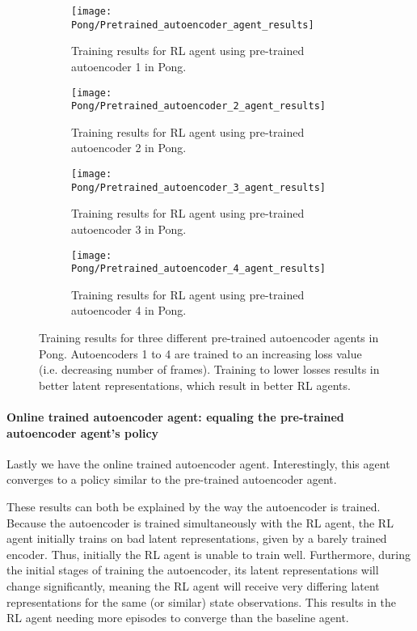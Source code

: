 \begin{figure}[h]
	\centering
	\begin{subfigure}[b]{0.49\textwidth}
		\texttt{[image: Pong/Pretrained\_autoencoder\_agent\_results]}
		\caption{Training results for RL agent using pre-trained autoencoder 1 in Pong.}
		\label{fig:ae1-results-pong}
	\end{subfigure}
	\begin{subfigure}[b]{0.49\textwidth}
		\texttt{[image: Pong/Pretrained\_autoencoder\_2\_agent\_results]}
		\caption{Training results for RL agent using pre-trained autoencoder 2 in Pong.}
		\label{fig:ae2-results-pong}
	\medskip
	\end{subfigure}
	\begin{subfigure}[b]{0.49\textwidth}
		\texttt{[image: Pong/Pretrained\_autoencoder\_3\_agent\_results]}
		\caption{Training results for RL agent using pre-trained autoencoder 3 in Pong.}
		\label{fig:ae3-results-pong}
	\end{subfigure}
	\begin{subfigure}[b]{0.49\textwidth}
		\texttt{[image: Pong/Pretrained\_autoencoder\_4\_agent\_results]}
		\caption{Training results for RL agent using pre-trained autoencoder 4 in Pong.}
		\label{fig:ae4-results-pong}
	\end{subfigure}
	\caption{Training results for three different pre-trained autoencoder agents in Pong. Autoencoders 1 to 4 are trained to an increasing loss value (i.e. decreasing number of frames). Training to lower losses results in better latent representations, which result in better RL agents.}
	\label{fig:ae-results-pong}
\end{figure}

\clearpage
\paragraph{Online trained autoencoder agent: equaling the pre-trained autoencoder agent's policy}
Lastly we have the online trained autoencoder agent. Interestingly, this agent converges to a policy similar to the pre-trained autoencoder agent.

These results can both be explained by the way the autoencoder is trained. Because the autoencoder is trained simultaneously with the RL agent, the RL agent initially trains on bad latent representations, given by a barely trained encoder. Thus, initially the RL agent is unable to train well. Furthermore, during the initial stages of training the autoencoder, its latent representations will change significantly, meaning the RL agent will receive very differing latent representations for the same (or similar) state observations. This results in the RL agent needing more episodes to converge than the baseline agent.

